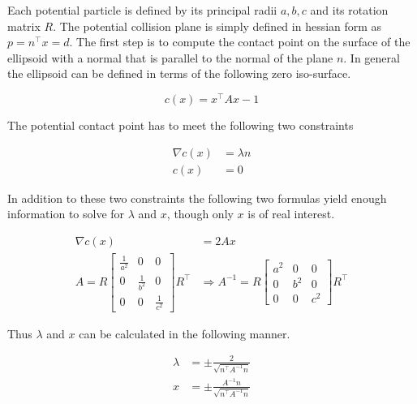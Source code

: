 Each potential particle is defined by its principal radii $a,b,c$ and its rotation matrix $R$. The potential collision plane is simply defined in hessian form as $p = n^\top x=d$. The first step is to compute the contact point on the surface of the ellipsoid with a normal that is parallel to the normal of the plane $n$. In general the ellipsoid can be defined in terms of the following zero iso-surface.

\begin{equation}
c(x) = x^\top A x - 1
\end{equation}

The potential contact point has to meet the following two constraints

\begin{align}
\nabla c(x)&=\lambda n \\
c(x) &= 0
\end{align}

In addition to these two constraints the following two formulas yield enough information to solve for $\lambda$ and $x$, though only $x$ is of real interest.

\begin{align}
\nabla c(x)&=2 A x \\
A = R \begin{bmatrix}\frac{1}{a^2} & 0 & 0 \\ 0 & \frac{1}{b^2} & 0 \\ 0 & 0 & \frac{1}{c^2}\end{bmatrix} R^\top &\Rightarrow A^{-1} = R \begin{bmatrix}a^2 & 0 & 0 \\ 0 & b^2 & 0 \\ 0 & 0 & c^2\end{bmatrix}R^\top
\end{align}

Thus $\lambda$ and $x$ can be calculated in the following manner.

\begin{align}
\lambda &= \pm \frac{2}{\sqrt{n^\top A^{-1} n}} \\
x &= \pm \frac{A^{-1}n}{\sqrt{n^\top A^{-1} n}}
\end{align}

